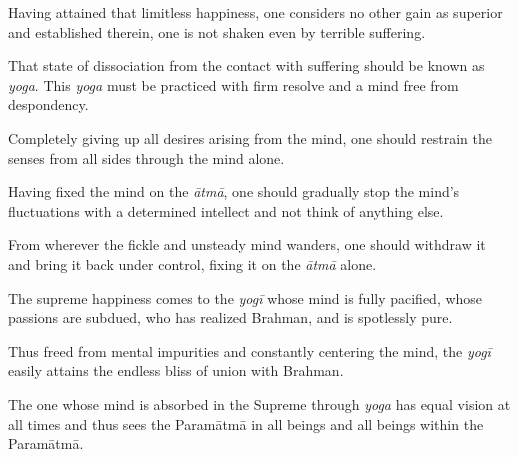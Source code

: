 {Having attained that limitless happiness, one considers no other gain as superior and established therein, one is not shaken even by terrible suffering.}

{That state of dissociation from the contact with suffering should be known as \textit{yoga}. This \textit{yoga} must be practiced with firm resolve and a mind free from despondency.}

{Completely giving up all desires arising from the mind, 
one should restrain the senses from all sides through the mind alone.}

{Having fixed the mind on the \textit{ātmā}, one should gradually stop the mind's fluctuations with a determined intellect and not think of anything else.}

{From wherever the fickle and unsteady mind wanders, one should withdraw it and bring it back under control, fixing it on the \textit{ātmā} alone.}

{The supreme happiness comes to the \textit{yogī} whose mind is fully pacified, whose passions are subdued, who has realized Brahman, and is spotlessly pure.}

{Thus freed from mental impurities and constantly centering the mind, the \textit{yogī} easily attains the endless bliss of union with Brahman.}

{The one whose mind is absorbed in the Supreme through \textit{yoga} has equal vision at all times and thus sees the Paramātmā in all beings and all beings within the Paramātmā.}

